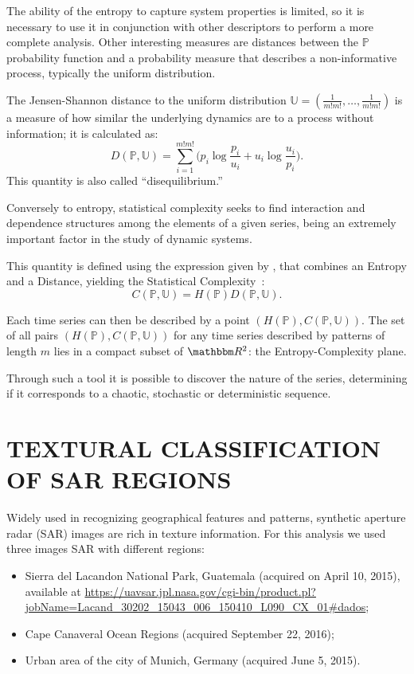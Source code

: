 \documentclass{isprs}
\begin{document}
The ability of the entropy to capture system properties is limited, so it is necessary to use it in conjunction with other descriptors to perform a more complete analysis.
Other interesting measures are distances between the $\mathbb{P}$ probability function and a probability measure that describes a non-informative process, typically the uniform distribution.

The Jensen-Shannon distance to the uniform distribution $\mathbb{U} = (\frac{1}{m!m!}, \dots, \frac{1}{m!m!})$ is a measure of how similar the underlying dynamics are to a process without information; it is calculated as:
\begin{equation}
D(\mathbb{P}, \mathbb{U}) = \sum_{i=1}^{m!m!} \Big(p_i \log\frac{p_i}{u_i} +
u_i \log\frac{u_i}{p_i}
\Big).
\end{equation}
This quantity is also called ``disequilibrium.''

Conversely to entropy, statistical complexity seeks to find interaction and dependence structures among the elements of a given series, being an extremely important factor in the study of dynamic systems.

This quantity is defined using the expression given by \citet{Lopez1995statistical}, 
that combines an Entropy and a Distance, yielding the Statistical Complexity~\citep{Feldman2008information,Feldman1998Statistical}:
\begin{equation}
C(\mathbb{P}, \mathbb{U}) = H(\mathbb{P}) D(\mathbb{P}, \mathbb{U}).
\end{equation}

Each time series can then be described by a point $(H(\mathbb{P}), C(\mathbb{P}, \mathbb{U}))$.
The set of all pairs $(H(\mathbb{P}), C(\mathbb{P}, \mathbb{U}))$ for any time series described by patterns of length $m$ lies in a compact subset of $\mathbbm R^2$: the Entropy-Complexity plane. 

Through such a tool it is possible to discover the nature of the series, determining if it corresponds to a chaotic, stochastic or deterministic sequence.

\section{TEXTURAL CLASSIFICATION OF SAR REGIONS}\label{SAR}

Widely used in recognizing geographical features and patterns, synthetic aperture radar (SAR) images are rich in texture information. 
For this analysis we used three images SAR with different regions:
\begin{itemize}
	\item Sierra del Lacandon National Park, Guatemala (acquired on April 10, 2015), available at \url{https://uavsar.jpl.nasa.gov/cgi-bin/product.pl?jobName=Lacand_30202_15043_006_150410_L090_CX_01#dados};
	\item Cape Canaveral Ocean Regions (acquired September 22, 2016);
	\item Urban area of the city of Munich, Germany (acquired June 5, 2015).
\end{itemize}
\end{document}
